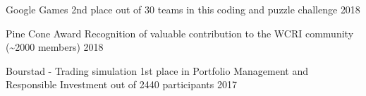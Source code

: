 
\begin{cvhonors}

  \cvhonor
    {Google Games} %
    {2nd place out of 30 teams in this coding and puzzle challenge} %
    {2018} %

  \cvhonor
    {Pine Cone Award} %
    {Recognition of valuable contribution to the WCRI community (\textasciitilde2000 members)} %
    {2018} %

  \cvhonor
    {Bourstad - Trading simulation} %
    {1st place in Portfolio Management and Responsible Investment out of 2440 participants} %
    {2017} %

\end{cvhonors}

